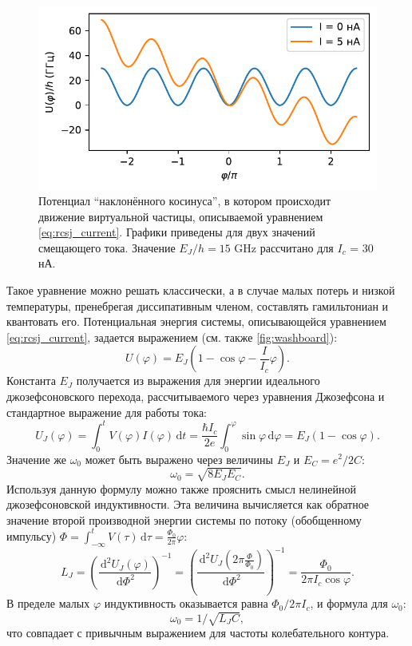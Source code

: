 \documentclass[14pt, a4paper]{extreport}
\newcommand{\diff}{\,\mathrm{d}}
\numberwithin{equation}{section}
\begin{document}
\begin{figure}
	\centering
	\includegraphics[width=0.7\linewidth]{Pictures/washboard}
	\caption{Потенциал ``наклонённого косинуса'', в котором происходит движение виртуальной частицы, описываемой уравнением \eqref{eq:rcsj_current}. Графики приведены для двух значений смещающего тока. Значение $E_J/h = 15$ GHz рассчитано для $I_c$ = 30 нА.}
	\label{fig:washboard}
\end{figure}

Такое уравнение можно решать классически, а в случае малых потерь и низкой температуры, пренебрегая диссипативным членом, составлять гамильтониан и квантовать его. Потенциальная энергия системы, описывающейся уравнением \eqref{eq:rcsj_current}, задается выражением (см. также \autoref{fig:washboard}):
\begin{equation}
	U(\varphi) = E_J\left(1-\cos \varphi - \frac{I}{I_c}\varphi\right).
\end{equation}
Константа $E_J$ получается из выражения для энергии идеального джозефсоновского перехода, рассчитываемого через уравнения Джозефсона и стандартное выражение для работы тока:
\begin{equation}
	U_J(\varphi) = \int_0^t V(\varphi) I(\varphi) \diff t = \frac{\hbar I_c}{2e}  \int_0^\varphi \sin\varphi \diff\varphi = E_J(1-\cos \varphi).
\end{equation}
Значение же $\omega_0$ может быть выражено через величины $E_J$ и $E_C = e^2/2C$:
\begin{equation}
	\omega_0 = \sqrt{8 E_J E_C}.
\end{equation}
Используя данную формулу можно также прояснить смысл нелинейной джозефсоновской индуктивности. Эта величина вычисляется как обратное значение второй производной энергии системы по потоку (обобщенному импульсу) $\Phi = \int_{-\infty}^{t} V(\tau) \diff \tau = \frac{\Phi_0}{2\pi} \varphi$:
\begin{equation}
	L_J = \left(\frac{\diff^2 U_J(\varphi)}{\diff \Phi^2}\right)^{-1} = \left(\frac{\diff^2 U_J(2\pi \frac{\Phi}{\Phi_0})}{\diff \Phi^2}\right)^{-1} = \frac{\Phi_0}{2\pi I_c \cos \varphi}.
\end{equation}
В пределе малых $\varphi$ индуктивность оказывается равна $\Phi_0/2\pi I_c$, и формула для $\omega_0$:
\begin{equation}
	\omega_0 = 1/\sqrt{L_J C},
\end{equation}
что совпадает с привычным выражением для частоты колебательного контура.
\end{document}
